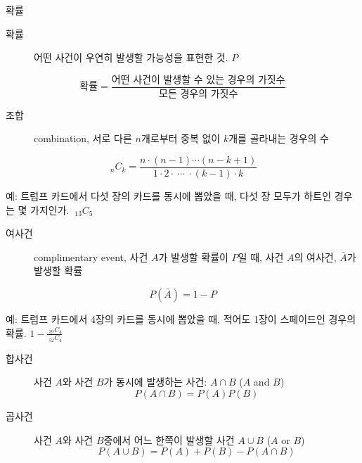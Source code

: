 \documentclass[10pt,t]{beamer}
\begin{document}
\begin{frame} {확률}
    \begin{description}
        \item[확률] 어떤 사건이 우연히 발생할 가능성을 표현한 것. $P$
    \end{description}
    \[\text{확률} = \frac{\text{어떤 사건이 발생할 수 있는 경우의 가짓수}}{\text{모든 경우의 가짓수}}\]

    \begin{description}
        \item[조합] combination, 서로 다른 $n$개로부터 중복 없이 $k$개를 골라내는 경우의 수
    \end{description}
    \[ ~_nC_k = \frac{n \cdot (n-1)\cdots (n-k+1)}{1\cdot 2\cdot~ \cdots~\cdot(k-1)\cdot k}\]
    
    예: 트럼프 카드에서 다섯 장의 카드를 동시에 뽑았을 때, 다섯 장 모두가 하트인 경우는 몇 가지인가. $~_{13}C_5$

    \pagebreak

    \begin{description}
        \item[여사건] complimentary event,  사건 $A$가 발생할 확률이 $P$일 때, 사건 $A$의 여사건, $\bar{A}$가 발생할 확률
    \end{description}
    \[P(\bar{A}) = 1 - P\]

    예: 트럼프 카드에서 4장의 카드를 동시에 뽑았을 때, 적어도 1장이 스페이드인 경우의 확률. $1- \frac{~_{39}C_4}{~_{52}C_4}$

    \pagebreak

    \begin{description}
        \item[합사건] 사건 $A$와 사건 $B$가 동시에 발생하는 사건: $A \cap B$ ($A$ and $B$)
        \[P(A \cap B ) = P(A)P(B)\]
        \item[곱사건] 사건 $A$와 사건 $B$중에서 어느 한쪽이 발생할 사건 $A \cup B$ ($A$ or $B$)
        \[P(A \cup B) = P(A)+P(B) - P(A \cap B)\] 
    \end{description}

    \def\firstcircle{(0,0) circle (1.5cm)}
\def\secondcircle{(0:2cm) circle (1.5cm)}



\setlength{\parskip}{5mm}


\end{frame}
\end{document}

